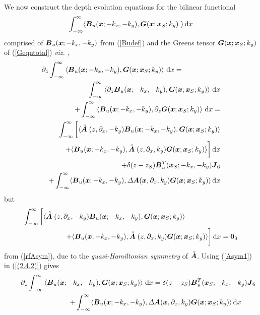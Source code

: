We now construct the depth evolution equations for the bilinear functional 
\[
\int_{-\infty}^{\infty} \langle{\mbox{\boldmath$\mit B$\unboldmath}}_{u}({\mbox{\boldmath$\mit x$\unboldmath}};-k_x,-k_y), 
{\mbox{\boldmath$\mit G$\unboldmath}}({\mbox{\boldmath$\mit x$\unboldmath}} ; {\mbox{\boldmath$\mit x$\unboldmath}}_{ S};k_y)\ \rangle \, {\rm d}x
\]
 comprised
of ${\mbox{\boldmath$\mit B$\unboldmath}}_{u}({\mbox{\boldmath$\mit x$\unboldmath}};-k_x,-k_y)$ from (\ref{Budef})  
and the  Greens tensor ${\mbox{\boldmath$\mit G$\unboldmath}}({\mbox{\boldmath$\mit x$\unboldmath}} ; {\mbox{\boldmath$\mit x$\unboldmath}}_{ S};k_y)$ of 
(\ref{Geqntotal}) {\em viz. \/},
\begin{eqnarray} \label{(2.4.2)} 
\lefteqn{{\partial }_{z} \int_{-\infty}^{\infty} \left\langle{  {\bmi B}_{u}({\bmi x};-k_x,-k_y),  
{\bmi G}({\bmi  x} ; {\bmi  x}_{ S};k_y)
}\right\rangle \,{\rm d}x  =
}\nonumber\\
&&
\int_{-\infty}^{\infty} \left\langle{ {\partial }_{z}  {\bmi B}_{u}({\bmi x};-k_x,-k_y),  
{\bmi G}({\bmi  x} ; {\bmi  x}_{ S};k_y)
}\right\rangle \,{\rm d}x \nonumber\\
&&+
\int_{-\infty}^{\infty} \left\langle{   {\bmi B}_{u}({\bmi x};-k_x,-k_y),  
{\partial }_{z} {\bmi G}({\bmi  x} ; {\bmi  x}_{ S};k_y)
}\right\rangle \,{\rm d}x=\nonumber\\
&&
\int_{-\infty}^{\infty} \bigg[ \langle \rf{\bmi A}({z},{\partial}_{x}, -k_y) {\bmi B}_{u}({\bmi x};-k_x,-k_y),  
{\bmi G}({\bmi  x} ; {\bmi  x}_{ S};k_y) \rangle   \nonumber\\
&&
+\langle{\bmi B}_{u}({\bmi x};-k_x,-k_y), 
\rf{\bmi A}({z},{\partial}_{x}, k_y) {\bmi G}({\bmi  x} ; {\bmi  x}_{ S};k_y) 
\rangle\bigg]\,{\rm d}x\nonumber\\
&&
+ \delta (z-{z}_{S}) {\bmi B}{}_{u}^{T}({\bmi x}_{S};-k_x,-k_y)
{\bmi  J}_{6}  \nonumber\\
&&
+ 
\int_{-\infty}^{\infty} \langle{\bmi B}_{u}({\bmi x};-k_x,-k_y), {\mit \Delta}
{\bmi A}({\bmi x},{\partial}_{x}, k_y) {\bmi G}({\bmi  x} ; {\bmi  x}_{ S};k_y) \rangle \,{\rm d}x
\end{eqnarray} 
but
\begin{eqnarray} \label{Asym1}
\lefteqn{\int_{-\infty}^{\infty} \bigg[ \langle \rf{\bmi A}({z},{\partial}_{x}, -k_y) {\bmi B}_{u}({\bmi x};-k_x,-k_y),  
{\bmi G}({\bmi  x} ; {\bmi  x}_{ S};k_y) \rangle }  \nonumber\\
&&
\qquad\qquad\quad
+\langle{\bmi B}_{u}({\bmi x};-k_x,-k_y), 
\rf{\bmi A}({z},{\partial}_{x}, k_y) {\bmi G}({\bmi  x} ; {\bmi  x}_{ S};k_y) 
\rangle\bigg]\,{\rm d}x= {\bf 0}_3
\end{eqnarray}
from (\ref{rfAsym}),
due to the {\em quasi-Hamiltonian symmetry\/} of $\stackrel{\scriptscriptstyle _{\,\,\circ}}{ \mbox{\boldmath$\mit A$\unboldmath}}$. Using 
(\ref{Asym1}) in (\ref{(2.4.2)}) gives
\begin{eqnarray} \label{BuG} 
\lefteqn{{\partial }_{z} \int_{-\infty}^{\infty} \left\langle{  {\bmi B}_{u}({\bmi x};-k_x,-k_y),  
{\bmi G}({\bmi  x} ; {\bmi  x}_{ S};k_y)
}\right\rangle \,{\rm d}x  =\delta (z-{z}_{S}) 
{\bmi B}{}_{u}^{T}({\bmi x}_{S};-k_x,-k_y)
{\bmi  J}_{6}
}\nonumber\\
&&
\qquad\qquad\qquad+ 
\int_{-\infty}^{\infty} \langle{\bmi B}_{u}({\bmi x};-k_x,-k_y), {\mit \Delta}
{\bmi A}({\bmi x},{\partial}_{x}, k_y) {\bmi G}({\bmi  x} ; {\bmi  x}_{ S};k_y) \rangle \,{\rm d}x
\end{eqnarray} 




